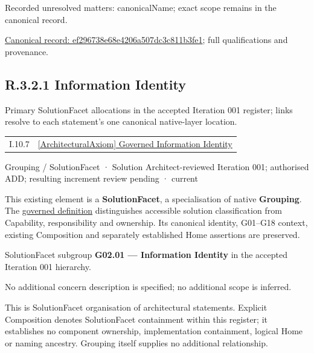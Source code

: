 {\small Recorded unresolved matters: canonicalName; exact scope remains in the canonical record.}\par
{\footnotesize \href{../../../../../../../continuum/grouping/ef296738e68e4206a507dc3c811b3fe1.md}{Canonical record: ef296738e68e4206a507dc3c811b3fe1}; full qualifications and provenance.}\par
\subsection*{R.3.2.1 Information Identity}
\label{navigation:R.3.2.1}

Primary SolutionFacet allocations in the accepted Iteration 001 register; links resolve to each statement’s one canonical native-layer location.\par
\begin{longtable}{p{.22\linewidth}p{.73\linewidth}}
I.10.7 & \hyperref[element:c2e7ee7597e64275b3523befd72c0987]{[ArchitecturalAxiom] Governed Information Identity} \\
\end{longtable}
\label{element:819aeed91d0544c3b7cc52e69aa46d72}
{\small Grouping / SolutionFacet · Solution Architect-reviewed Iteration 001; authorised ADD; resulting increment review pending · current}\par

This existing element is a \textbf{SolutionFacet}, a specialisation of native
\textbf{Grouping}. The \href{\detokenize{../../../../../../../governance/continuum-representation.md#solutionfacet-classification--1119-candidate}}{governed definition}
distinguishes accessible solution classification from Capability, responsibility
and ownership. Its canonical identity, G01–G18 context, existing Composition
and separately established Home assertions are preserved.



SolutionFacet subgroup \textbf{G02.01 — Information Identity} in the accepted Iteration 001 hierarchy.



No additional concern description is specified; no additional scope is inferred.



This is SolutionFacet organisation of architectural statements. Explicit Composition denotes SolutionFacet containment within this register; it establishes no component ownership, implementation containment, logical Home or naming ancestry. Grouping itself supplies no additional relationship.


